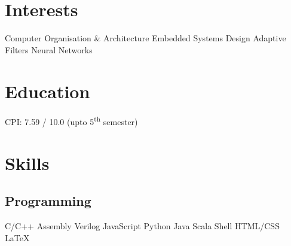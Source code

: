 \documentclass[]{deedy}
\begin{document}
\begin{minipage}[t]{0.27\textwidth}
\begin{flushleft}
%
\section{Interests}
Computer Organisation \& Architecture \textbullet{} Embedded Systems Design \textbullet{} Adaptive \\
Filters \textbullet{} Neural Networks
\sectionsep
\section{Education}
%
CPI: 7.59 / 10.0 (upto 5\textsuperscript{th} semester) \\
\sectionsep
%
\sectionsep
%
\sectionsep
\section{Skills}
\subsection{Programming}
C/C++ \textbullet{} Assembly \textbullet{} Verilog \textbullet{} JavaScript \textbullet{} Python \textbullet{} Java \textbullet{} Scala \textbullet{} Shell \textbullet{} HTML/CSS \textbullet{} \\
\LaTeX\ 
%

\end{flushleft}
\end{minipage}
\end{document}
